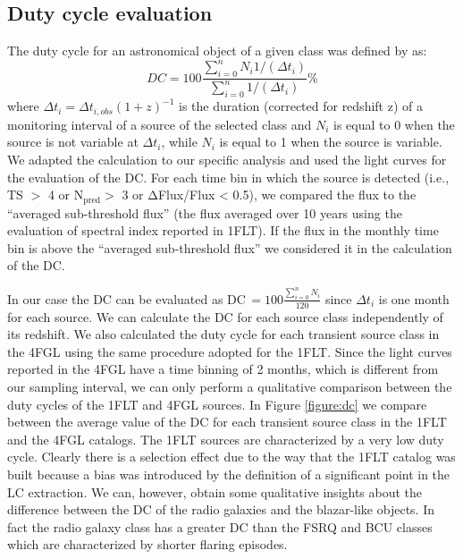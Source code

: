 \documentclass{aastex62}
\begin{document}
\subsection{Duty cycle evaluation}\label{DC}
The duty cycle for an astronomical object of a given class was defined by \citet{romero1999optical} as:
\begin{equation}
    DC = 100\frac{\sum_{i=0}^n N_i 1/(\Delta t_i)}{\sum_{i=0}^n 1/(\Delta t_i)}\%
\end{equation}
where $\Delta t_i = \Delta t_{i,obs}(1+z)^{-1}$
is the duration (corrected for redshift z) of a monitoring interval of a source of the selected class and $N_i$ is equal to 0 when the source is not variable at $\Delta t_i$, while $N_i$ is equal to 1 when the source is variable.
We adapted the calculation to our specific analysis and used the light curves  for the evaluation of the DC.
For each time bin in which the source is detected (i.e., TS $>$ 4 or N$\mathrm{_{pred}}>$ 3 or $\mathrm{\Delta}$Flux/Flux < 0.5), we compared the flux to the ``averaged sub-threshold flux'' (the flux averaged over 10 years using the evaluation of spectral index reported in 1FLT). If the flux in the monthly time bin is above the ``averaged sub-threshold flux'' we considered it in the calculation of the DC. 

In our case the DC can be evaluated as
DC\,\begin{math}=100\frac{\sum_{i=0}^n N_i }{120}
\end{math}
since $\Delta t_i$ is one month for each source. We can calculate the DC for each source class independently of its redshift.
We also calculated the duty cycle for each transient source class in the 4FGL using the same procedure adopted for the 1FLT. Since the light curves reported in the 4FGL have a time binning of 2 months, which is different from our sampling interval, we can only perform a qualitative comparison between the duty cycles of the 1FLT and 4FGL sources. In Figure \ref{figure:dc} we compare between the average value of the DC for each transient source class in the 1FLT and the 4FGL catalogs. The 1FLT sources are characterized by a very low duty cycle. 
Clearly there is a selection effect due to the way that the 1FLT catalog was built because a bias was introduced by the definition of a significant point in the LC extraction. We can, however, obtain some qualitative insights about the difference between the DC of the radio galaxies and the blazar-like objects. In fact the radio galaxy class has a greater DC than the FSRQ and BCU classes which are characterized by shorter flaring episodes. 
\end{document}
